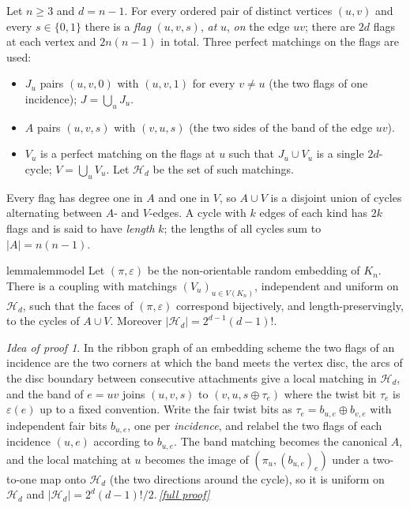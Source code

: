 \documentclass[11pt,a4paper]{article}
\theoremstyle{plain}
\theoremstyle{definition}
\theoremstyle{remark}
\newtheorem*{proofidea}{Idea of proof}
\newcommand{\fullproofref}[1]{\,\hyperref[#1]{\textit{[full proof]}}}
\providecommand{\tightlist}{\setlength{\itemsep}{0pt}\setlength{\parskip}{0pt}}
\newcommand{\cH}{\mathcal H}
\begin{document}
Let $n\ge3$ and $d=n-1$. For every ordered pair of distinct vertices $(u,v)$ and every $s\in\{0,1\}$ there is a \emph{flag} $(u,v,s)$, \emph{at} $u$, \emph{on} the edge $uv$; there are $2d$ flags at each vertex and $2n(n-1)$ in total. Three perfect matchings on the flags are used:
\begin{itemize}\tightlist
\item $J_u$ pairs $(u,v,0)$ with $(u,v,1)$ for every $v\ne u$ (the two flags of one incidence); $J=\bigcup_uJ_u$.
\item $A$ pairs $(u,v,s)$ with $(v,u,s)$ (the two sides of the band of the edge $uv$).
\item $V_u$ is a perfect matching on the flags at $u$ such that $J_u\cup V_u$ is a single $2d$-cycle; $V=\bigcup_uV_u$. Let $\cH_d$ be the set of such matchings.
\end{itemize}
Every flag has degree one in $A$ and one in $V$, so $A\cup V$ is a disjoint union of cycles alternating between $A$- and $V$-edges. A cycle with $k$ edges of each kind has $2k$ flags and is said to have \emph{length} $k$; the lengths of all cycles sum to $|A|=n(n-1)$.

\begin{restatable}{lemma}{lemmodel}\label{lem:model}
Let $(\pi,\varepsilon)$ be the non-orientable random embedding of $K_n$. There is a coupling with matchings $(V_u)_{u\in V(K_n)}$, independent and uniform on $\cH_d$, such that the faces of $(\pi,\varepsilon)$ correspond bijectively, and length-preservingly, to the cycles of $A\cup V$. Moreover $|\cH_d|=2^{d-1}(d-1)!$.
\end{restatable}
\begin{proofidea}
In the ribbon graph of an embedding scheme the two flags of an incidence are the two corners at which the band meets the vertex disc, the arcs of the disc boundary between consecutive attachments give a local matching in $\cH_d$, and the band of $e=uv$ joins $(u,v,s)$ to $(v,u,s\oplus\tau_e)$ where the twist bit $\tau_e$ is $\varepsilon(e)$ up to a fixed convention. Write the fair twist bits as $\tau_e=b_{u,e}\oplus b_{v,e}$ with independent fair bits $b_{u,e}$, one per \emph{incidence}, and relabel the two flags of each incidence $(u,e)$ according to $b_{u,e}$. The band matching becomes the canonical $A$, and the local matching at $u$ becomes the image of $(\pi_u,(b_{u,e})_e)$ under a two-to-one map onto $\cH_d$ (the two directions around the cycle), so it is uniform on $\cH_d$ and $|\cH_d|=2^d(d-1)!/2$.\fullproofref{pf:model}
\end{proofidea}
\end{document}
